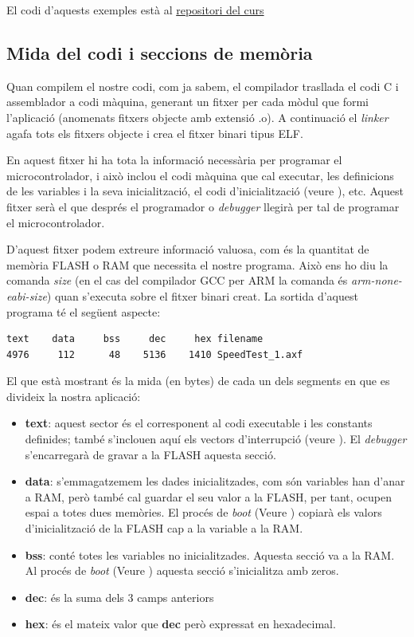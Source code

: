 
El codi d'aquests exemples està al \href{https://github.com/mariusmm/cursembedded/tree/master/Simplicity/MemoryMap}{repositori del curs}

\subsection{Mida del codi i seccions de memòria}
\label{sub:size}
Quan compilem el nostre codi, com ja sabem, el compilador trasllada el codi C i assemblador a codi màquina, generant un fitxer per cada mòdul que formi l'aplicació (anomenats fitxers objecte amb extensió .o). A continuació el {\em linker} agafa tots els fitxers objecte i crea el fitxer binari tipus ELF.

En aquest fitxer hi ha tota la informació necessària per programar el microcontrolador, i això inclou el codi màquina que cal executar, les definicions de les variables i la seva inicialització, el codi d'inicialització (veure ), etc. Aquest fitxer serà el que després el programador o {\em debugger} llegirà per tal de programar el microcontrolador.

D'aquest fitxer podem extreure informació valuosa, com és la quantitat de memòria FLASH o RAM que necessita el nostre programa. Això ens ho diu la comanda {\em size} (en el cas del compilador \gls{GCC} per \gls{ARM} la comanda és {\em arm-none-eabi-size}) quan s'executa sobre el fitxer binari creat. La sortida d'aquest programa té el següent aspecte:

\begin{lstlisting}
text    data     bss     dec     hex filename
4976     112      48    5136    1410 SpeedTest_1.axf
\end{lstlisting}

El que està mostrant és la mida (en bytes) de cada un dels segments en que es divideix la nostra aplicació:
\begin{itemize}
 \item {\bf text}: aquest sector és el corresponent al codi executable i les constants definides; també s'inclouen aquí els vectors d'interrupció (veure ). El {\em debugger} s'encarregarà de gravar a la FLASH aquesta secció.
 \item {\bf data}: s'emmagatzemem les dades inicialitzades, com són variables han d'anar a RAM, però també cal guardar el seu valor a la FLASH, per tant, ocupen espai a totes dues memòries. El procés de {\em boot} (Veure ) copiarà els valors d'inicialització de la FLASH cap a la variable a la RAM.
 \item {\bf bss}: conté totes les variables no inicialitzades. Aquesta secció va a la RAM. Al procés de {\em boot} (Veure ) aquesta secció s'inicialitza amb zeros.
 \item {\bf dec}: és la suma dels 3 camps anteriors
 \item {\bf hex}: és el mateix valor que {\bf dec} però expressat en hexadecimal.
\end{itemize}

